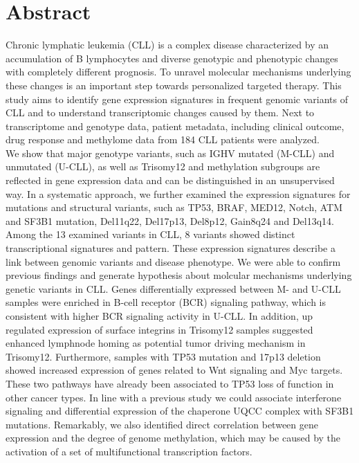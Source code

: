 \documentclass[a4paper,fontsize=12pt,headsepline]{scrartcl}
\begin{document}
\setcounter{page}{0}

\cleardoublepage

\onehalfspacing	
\newcommand{\fixme}[1]{\textsl{\textcolor{Orange}{(fixme: #1)}}}
\section*{Abstract} 
Chronic lymphatic leukemia (CLL) is a complex disease characterized by an accumulation of B lymphocytes and diverse genotypic and phenotypic changes with completely different prognosis. To unravel molecular mechanisms underlying these changes is an important step towards personalized targeted therapy. This study aims to identify gene expression signatures in frequent genomic variants of CLL and to understand transcriptomic changes caused by them. Next to transcriptome and genotype data, patient metadata, including clinical outcome, drug response and methylome data from 184 CLL patients were analyzed. \\

We show that major genotype variants, such as IGHV mutated (M-CLL) and unmutated (U-CLL), as well as Trisomy12 and methylation subgroups are reflected in gene expression data and can be distinguished in an unsupervised way. In a systematic approach, we further examined the expression signatures for mutations and structural variants, such as TP53, BRAF, MED12, Notch, ATM and SF3B1 mutation, Del11q22, Del17p13, Del8p12, Gain8q24 and Del13q14. Among the 13 examined variants in CLL, 8 variants showed distinct transcriptional signatures and pattern. These expression signatures describe a link between genomic variants and disease phenotype. We were able to confirm previous findings and generate hypothesis about molcular mechanisms underlying genetic variants in CLL. Genes differentially expressed between M- and U-CLL samples were enriched in B-cell receptor (BCR) signaling pathway, which is consistent with higher BCR signaling activity in U-CLL.  In addition, up regulated expression of surface integrins in Trisomy12 samples suggested enhanced lymphnode homing as potential tumor driving mechanism in Trisomy12. Furthermore, samples with TP53 mutation and 17p13 deletion showed increased expression of genes related to Wnt signaling and Myc targets. These two pathways have already been associated to TP53 loss of function in other cancer types. In line with a previous study we could associate interferone signaling and differential expression of the chaperone UQCC complex with SF3B1 mutations. Remarkably, we also identified direct correlation between gene expression and the degree of genome methylation, which may be caused by the activation of a set of multifunctional transcription factors. \\
  
\end{document}
